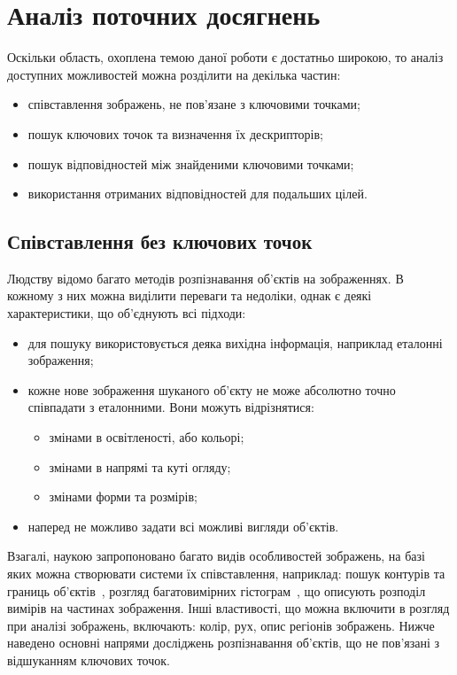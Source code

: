 \chapter{Аналіз поточних досягнень}
\label{sec:analys}

Оскільки область, охоплена темою даної роботи є достатньо широкою, то аналіз доступних можливостей можна розділити на декілька частин:

\begin{itemize}
  \item співставлення зображень, не пов'язане з ключовими точками;
  \item пошук ключових точок та визначення їх дескрипторів;
  \item пошук відповідностей між знайденими ключовими точками;
  \item використання отриманих відповідностей для подальших цілей.
\end{itemize}

\section{Співставлення без ключових точок}
\label{sec:non-keypoint}

Людству відомо багато методів розпізнавання об'єктів на зображеннях. В кожному з них можна виділити переваги та недоліки, однак є деякі характеристики, що об'єднують всі підходи:

\begin{itemize}
  \item для пошуку використовується деяка вихідна інформація, наприклад еталонні зображення;
  \item кожне нове зображення шуканого об'єкту не може абсолютно точно співпадати з еталонними. Вони можуть відрізнятися: 
    \begin{itemize}
      \item змінами в освітленості, або кольорі;
      \item змінами в напрямі та куті огляду;
      \item змінами форми та розмірів;
    \end{itemize}
  \item наперед не можливо задати всі можливі вигляди об'єктів.
\end{itemize}

Взагалі, наукою запропоновано багато видів особливостей зображень, на базі яких можна створювати системи їх співставлення, наприклад: пошук контурів та границь об'єктів~\cite{Mikolajczyk03shape}, розгляд багатовимірних гістограм~\cite{Schiele00recognitionwithout}, що описують розподіл вимірів на частинах зображення. Інші властивості, що можна включити в розгляд при аналізі зображень, включають: колір, рух, опис регіонів зображень. 
Нижче наведено основні напрями досліджень розпізнавання об'єктів, що не пов'язані з відшуканням ключових точок.

